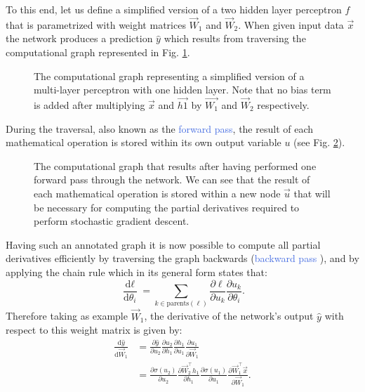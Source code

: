 To this end, let us define a simplified version of a two hidden layer perceptron $f$ that is parametrized with weight matrices $\vec{W}_1$ and $\vec{W}_2$. When given input data $\vec{x}$ the network produces a prediction $\hat{y}$ which results from traversing the computational graph represented in Fig. \ref{fig:computational_graph_1}.  
\begin{figure}[ht!]
	\centering
	
	\caption{The computational graph representing a simplified version of a multi-layer perceptron with one hidden layer. Note that no bias term is added after multiplying $\vec{x}$ and $\vec{h1}$ by $\vec{W_1}$ and $\vec{W}_2$ respectively.}
\label{fig:computational_graph_1}
\end{figure}
During the traversal, also known as the \textcolor{RoyalBlue}{forward pass}, the result of each mathematical operation is stored within its own output variable $u$ (see Fig. \ref{fig:computational_graph_2}). 
\begin{figure}[ht!]
	\centering
	
	\caption{The computational graph that results after having performed one forward pass through the network. We can see that the result of each mathematical operation is stored within a new node $\vec{u}$ that will be necessary for computing the partial derivatives required to perform stochastic gradient descent.}
\label{fig:computational_graph_2}
\end{figure}
Having such an annotated graph it is now possible to compute all partial derivatives efficiently by traversing the graph backwards (\textcolor{RoyalBlue}{backward pass} \cite{linnainmaa1970representation}), and by applying the chain rule which in its general form states that:
\begin{equation}
	\frac{\text{d} \ell}{\text{d} \theta_i} = \sum_{k\in\text{parents}(\ell)} \frac{\partial \ell}{\partial u_k} \frac{\partial u_k}{\partial \theta_i}.
\end{equation}
Therefore taking as example $\vec{W}_1$, the derivative of the network's output $\hat{y}$ with respect to this weight matrix is given by:
\label{eq:general_chain_rule}
\begin{equation}
	\begin{split}
		\frac{\text{d} \hat{y}}{\text{d} \vec{W}_1} & = \frac{\partial \hat{y}}{\partial u_2} \frac{\partial u_2}{\partial h_1} \frac{\partial h_1}{\partial u_1} \frac{\partial u_1}{\partial\vec{W}_1} \\
	& = \frac{\partial\sigma(u_2)}{\partial u_2} \frac{\partial\vec{W}_2^{\intercal}h_1}{\partial h_1} \frac{\partial \sigma(u_1)}{\partial u_1} \frac{\partial \vec{W}_1^{\intercal}\vec{x}}{\partial{\vec{W}_1}}.
	\end{split}
	\label{eq:applied_chain_rule}
\end{equation}

